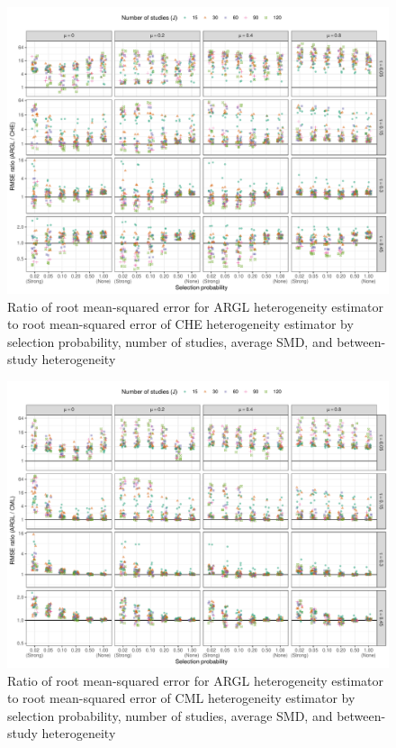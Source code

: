 \documentclass[
  man, donotrepeattitle,floatsintext]{apa7}
\begin{document}
\begin{figure}
\includegraphics{selection_models_draft_files/figure-latex/heterogeneity-rmse-ARGL-CHE-1} \caption{Ratio of root mean-squared error for ARGL heterogeneity estimator to root mean-squared error of CHE heterogeneity estimator by selection probability, number of studies, average SMD, and between-study heterogeneity}\label{fig:heterogeneity-rmse-ARGL-CHE}
\end{figure}

\begin{figure}
\includegraphics{selection_models_draft_files/figure-latex/heterogeneity-rmse-ARGL-CML-1} \caption{Ratio of root mean-squared error for ARGL heterogeneity estimator to root mean-squared error of CML heterogeneity estimator by selection probability, number of studies, average SMD, and between-study heterogeneity}\label{fig:heterogeneity-rmse-ARGL-CML}
\end{figure}
\end{document}
